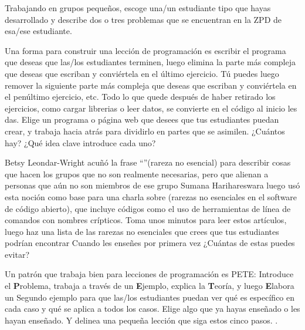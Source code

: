 Trabajando en grupos pequeños,
escoge una/un estudiante tipo que hayas desarrollado
y describe dos o tres problemas que se encuentran en la ZPD de esa/ese estudiante.
 
 
Una forma para construir una lección de programación
es escribir el programa que deseas que las/los estudiantes terminen,
luego elimina la parte más compleja que deseas que escriban
y conviértela en el último ejercicio.
Tú puedes luego remover la siguiente parte más compleja que deseas que escriban
y conviértela en el penúltimo ejercicio, etc.
Todo lo que quede después de haber retirado los ejercicios,
como cargar librerias o leer datos,
se convierte en el código al inicio les das.
 Elige un programa o página web que desees que
tus estudiantes puedan crear,
y trabaja hacia atrás para dividirlo en partes que se asimilen.
¿Cuántos hay?
¿Qué idea clave introduce cada uno?
 
 
Betsy Leondar-Wright acuñó la frase
``''(rareza no esencial)
para describir cosas que hacen los grupos
que no son realmente necesarias,
pero que alienan a personas que aún no son miembros de ese grupo
Sumana Harihareswara luego usó esta noción
como base para una charla sobre
(rarezas no esenciales en el software de código abierto),
que incluye códigos como el uso de herramientas de línea de comandos con nombres crípticos.
Toma unos minutos para leer estos artículos,
luego haz una lista de las rarezas no esenciales que crees
que tus estudiantes podrían encontrar
Cuando les enseñes por primera vez
¿Cuántas de estas puedes evitar?
 

Un patrón que trabaja bien para lecciones de programación es PETE:
Introduce el  \textbf{P}roblema,
trabaja a través de un \textbf{E}jemplo,
explica la \textbf{T}eoría,
y luego \textbf{E}labora un Segundo ejemplo
para que las/los estudiantes puedan ver qué es específico en cada caso
y qué se aplica a todos los casos.
Elige algo que ya hayas enseñado o les hayan enseñado.
Y delinea una pequeña lección que siga estos cinco pasos.
.

